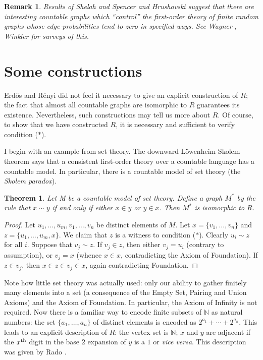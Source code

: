 \documentclass[12pt]{article}
\newtheorem{theorem}{Theorem}
\newtheorem{remark}{Remark}
\begin{document}
\begin{remark}\rm
Results of Shelah and Spencer
\cite{ch32:bib47} and Hrushovski \cite{ch32:bib31} suggest that
there are interesting countable graphs which ``control'' the
first-order theory of finite random graphs whose edge-probabilities
tend to zero in specified ways. See Wagner \cite{ch32:bib54},
Winkler \cite{ch32:bib55} for surveys of this.
\end{remark}

\section{Some constructions}%
\label{ch32:sec2.2}

Erd\H{o}s and R\'{e}nyi did not feel it necessary to give an
explicit construction of $R$; the fact that almost all countable
graphs are isomorphic to $R$ guarantees its existence. Nevertheless,
such constructions may tell us more about $R$. Of course, to show
that we have constructed $R$, it is necessary and sufficient to
verify condition ($\ast$).

I begin with an example from set theory. The downward
L\"{o}wenheim-Skolem theorem says that a consistent first-order
theory over a countable language has a countable model. In
particular, there is a countable model of set theory (the
\emph{Skolem paradox}).

\begin{theorem}\label{ch32:them2.1} 
Let M be a countable model of set theory.
Define a graph $M^{\ast}$ by the rule that $x\sim y$ if and only if
either $x\in y$ or $y\in x$. Then $M^{\ast}$ is isomorphic to $R$.
\end{theorem}
\begin{proof}
Let $u_1, \ldots, u_m, v_1, \ldots, v_n$ be
distinct elements of $M$. Let $x = \{v_1,\ldots, v_n\}$ and $z =
\{u_1, \ldots, u_m, x\}$. We claim that $z$ is a witness to
condition ($\ast$). Clearly $u_i\sim z$ for all $i$. Suppose that
$v_j \sim z$. If $v_j \in z$, then either $v_j = u_i$ (contrary to
assumption), or $v_j = x$ (whence $x \in x$, contradicting the Axiom
of Foundation). If $z\in v_j$, then $x \in z \in v_j \in x$, again
contradicting Foundation.
\end{proof}

Note how little set theory was actually used: only our ability to
gather finitely many elements into a set (a consequence of the Empty
Set, Pairing and Union Axioms) and the Axiom of Foundation. In
particular, the Axiom of Infinity is not required. Now there is a
familiar way to encode finite subsets of $\mathbb{N}$ as natural
numbers: the set $\{a_1, \ldots,a_n\}$ of distinct elements is
encoded as $2^{a_1}+ \cdots+ 2^{a_n}$. This leads to an explicit
description of $R$: the vertex set is $\mathbb{N}$; $x$ and $y$ are
adjacent if the $x^{\rm th}$ digit in the base $2$ expansion of $y$ is
a $1$ or \emph{vice versa}. This description was given by Rado
\cite{ch32:bib42}.
\end{document}
